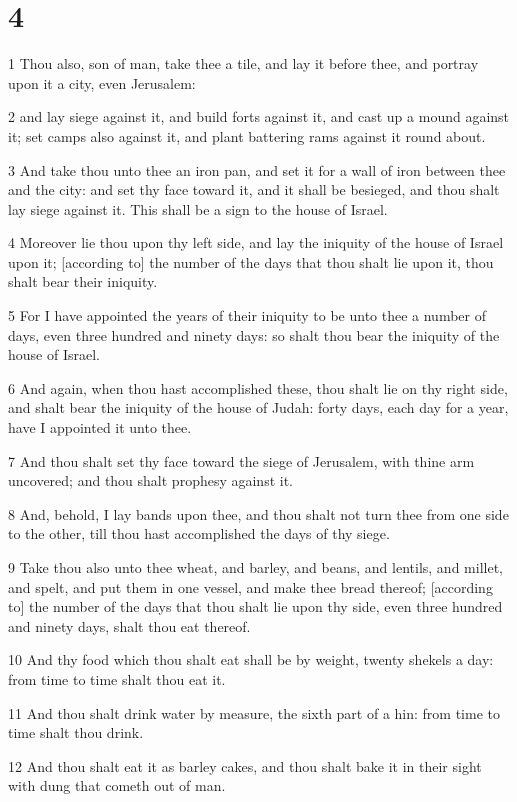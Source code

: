 \chapter{4}

\par 1 Thou also, son of man, take thee a tile, and lay it before thee, and portray upon it a city, even Jerusalem:
\par 2 and lay siege against it, and build forts against it, and cast up a mound against it; set camps also against it, and plant battering rams against it round about.
\par 3 And take thou unto thee an iron pan, and set it for a wall of iron between thee and the city: and set thy face toward it, and it shall be besieged, and thou shalt lay siege against it. This shall be a sign to the house of Israel.
\par 4 Moreover lie thou upon thy left side, and lay the iniquity of the house of Israel upon it; [according to] the number of the days that thou shalt lie upon it, thou shalt bear their iniquity.
\par 5 For I have appointed the years of their iniquity to be unto thee a number of days, even three hundred and ninety days: so shalt thou bear the iniquity of the house of Israel.
\par 6 And again, when thou hast accomplished these, thou shalt lie on thy right side, and shalt bear the iniquity of the house of Judah: forty days, each day for a year, have I appointed it unto thee.
\par 7 And thou shalt set thy face toward the siege of Jerusalem, with thine arm uncovered; and thou shalt prophesy against it.
\par 8 And, behold, I lay bands upon thee, and thou shalt not turn thee from one side to the other, till thou hast accomplished the days of thy siege.
\par 9 Take thou also unto thee wheat, and barley, and beans, and lentils, and millet, and spelt, and put them in one vessel, and make thee bread thereof; [according to] the number of the days that thou shalt lie upon thy side, even three hundred and ninety days, shalt thou eat thereof.
\par 10 And thy food which thou shalt eat shall be by weight, twenty shekels a day: from time to time shalt thou eat it.
\par 11 And thou shalt drink water by measure, the sixth part of a hin: from time to time shalt thou drink.
\par 12 And thou shalt eat it as barley cakes, and thou shalt bake it in their sight with dung that cometh out of man.
